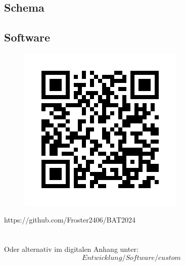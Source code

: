 \documentclass[12pt]{article}
\begin{document}
	\newpage
	\thispagestyle{empty} 
	\subsection{Schema}
	\begin{minipage}[b]{\textwidth}
		
	\end{minipage}
	
	\newpage
	\thispagestyle{empty} 
	\subsection{Software} \label{Anhang:Software}
	\begin{figure}[H]
		\centering
		\includegraphics[width=1\linewidth]{images/BAT_QR-Code_Github-Repo}
		\label{fig:batqr-codegithub-repo}
	\end{figure}
	https://github.com/Froster2406/BAT2024 \\ \\ \\
	Oder alternativ im digitalen Anhang unter:\\
	$$Entwicklung/Software/custom$$
	
	\newpage
	\thispagestyle{empty} 
\end{document}

